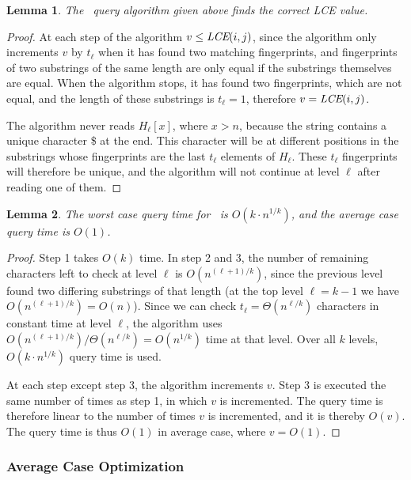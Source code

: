 \documentclass[a4]{article}
\newtheorem{lemma}{Lemma}
\begin{document}
\begin{lemma}
The \fprintk\ query algorithm given above finds the correct LCE value.
\end{lemma}
\begin{proof}
At each step of the algorithm $v \leq \textit{LCE}(i,j)$, since the algorithm only increments $v$ by $t_\ell$ when it has found two matching fingerprints, and fingerprints of two substrings of the same length are only equal if the substrings themselves are equal. When the algorithm stops, it has found two fingerprints, which are not equal, and the length of these substrings is $t_\ell = 1$, therefore $v = \textit{LCE}(i,j)$.

The algorithm never reads $H_\ell[x]$, where $x>n$, because the string contains a unique character \$ at the end. This character will be at different positions in the substrings whose fingerprints are the last $t_\ell$ elements of $H_\ell$. These $t_\ell$ fingerprints will therefore be unique, and the algorithm will not continue at level $\ell$ after reading one of them.
\end{proof}

\begin{lemma}
The worst case query time for \fprintk\ is $O(k\cdot n^{1/k})$, and the average case query time is $O(1)$.
\end{lemma}
\begin{proof}
Step 1 takes $O(k)$ time. In step 2 and 3, the number of remaining characters left to check at level $\ell$ is $O(n^{(\ell+1)/k})$, since the previous level found two differing substrings of that length (at the top level $\ell=k-1$ we have $O(n^{(\ell+1)/k}) = O(n)$). Since we can check $t_\ell = \Theta(n^{\ell/k})$ characters in constant time at level $\ell$, the algorithm uses $O(n^{(\ell+1)/k})/\Theta(n^{\ell/k}) = O(n^{1/k})$ time at that level. Over all $k$ levels, $O(k\cdot n^{1/k})$ query time is used.

At each step except step 3, the algorithm increments $v$. Step 3 is executed the same number of times as step 1, in which $v$ is incremented. The query time is therefore linear to the number of times $v$ is incremented, and it is thereby $O(v)$. The query time is thus $O(1)$ in average case, where $v=O(1)$.
\end{proof}

\subsubsection{Average Case Optimization\label{sec:improved-avg}}
\end{document}
